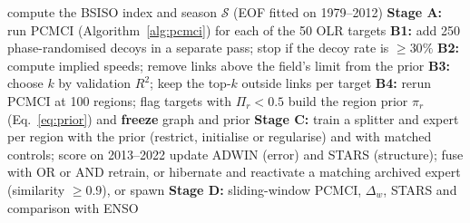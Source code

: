 \begin{algorithm}[htbp]
\caption{Build, validate, freeze and use the causal graph, and keep experts current}
\label{alg:build-validate}
\small
\begin{algorithmic}[1]
\State compute the BSISO index and season $\mathcal{S}$ (EOF fitted on 1979--2012)
\State \textbf{Stage A:} run PCMCI (Algorithm~\ref{alg:pcmci}) for each of the 50 OLR targets
\State \textbf{B1:} add 250 phase-randomised decoys in a separate pass; stop if the decoy rate is $\ge 30\%$
\State \textbf{B2:} compute implied speeds; remove links above the field's limit from the prior
\State \textbf{B3:} choose $k$ by validation $R^2$; keep the top-$k$ outside links per target
\State \textbf{B4:} rerun PCMCI at 100 regions; flag targets with $\Pi_r<0.5$
\State build the region prior $\pi_r$ (Eq.~\ref{eq:prior}) and \textbf{freeze} graph and prior
\State \textbf{Stage C:} train a splitter and expert per region with the prior (restrict, initialise or regularise) and with matched controls; score on 2013--2022
 
  \State update ADWIN (error) and STARS (structure); fuse with OR or AND
   retrain, or hibernate and reactivate a matching archived expert (similarity $\ge 0.9$), or spawn
  \EndIf
\EndFor
\State \textbf{Stage D:} sliding-window PCMCI, $\Delta_w$, STARS and comparison with ENSO
\end{algorithmic}
\end{algorithm}
